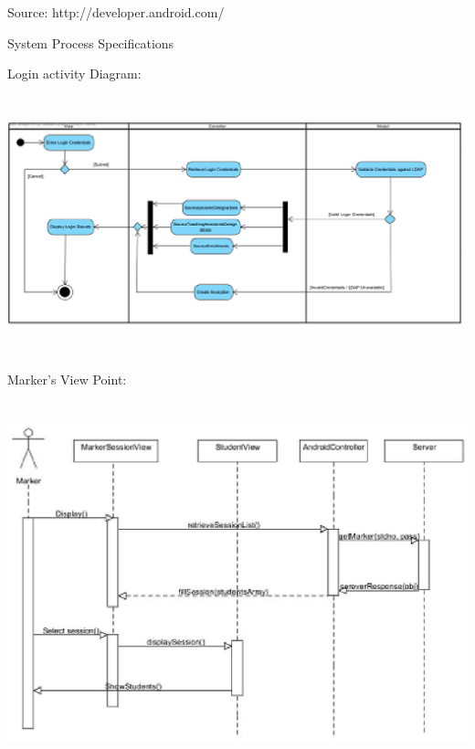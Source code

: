 \documentclass{article}
\begin{document}
\noindent Source: http://developer.android.com/ 

\noindent 

\noindent 

\noindent 

\noindent 

\noindent System Process Specifications

\noindent Login activity Diagram:

\textbf{\includegraphics*[width=6.50in, height=2.94in, keepaspectratio=false]{image21}}









\noindent Marker's View Point:  

\textbf{\includegraphics*[width=5.91in, height=4.13in, keepaspectratio=false]{image22}}
\end{document}
